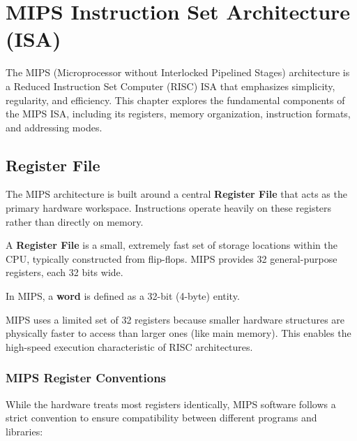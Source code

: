 \chapter{MIPS Instruction Set Architecture (ISA)}

The MIPS (Microprocessor without Interlocked Pipelined Stages) architecture is a Reduced Instruction Set Computer (RISC) ISA that emphasizes simplicity, regularity, and efficiency. This chapter explores the fundamental components of the MIPS ISA, including its registers, memory organization, instruction formats, and addressing modes.

\section{Register File}

The MIPS architecture is built around a central \textbf{Register File} that acts as the primary hardware workspace. Instructions operate heavily on these registers rather than directly on memory.

\begin{definition}
A \textbf{Register File} is a small, extremely fast set of storage locations within the CPU, typically constructed from flip-flops. MIPS provides 32 general-purpose registers, each 32 bits wide.
\end{definition}

\begin{vocabulary}[Word]
In MIPS, a \textbf{word} is defined as a 32-bit (4-byte) entity.
\end{vocabulary}

\begin{proposition}
MIPS uses a limited set of 32 registers because smaller hardware structures are physically faster to access than larger ones (like main memory). This enables the high-speed execution characteristic of RISC architectures.
\end{proposition}

\subsection{MIPS Register Conventions}

While the hardware treats most registers identically, MIPS software follows a strict convention to ensure compatibility between different programs and libraries:

